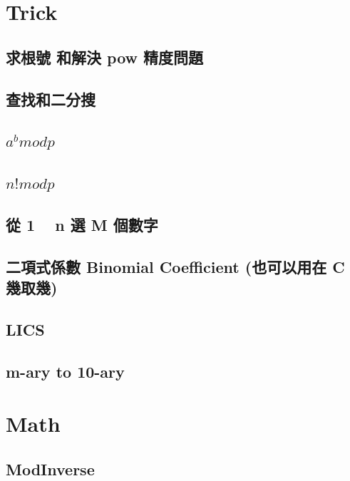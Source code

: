 \section{Trick}
    \subsection{求根號 和解決 pow 精度問題}
        
    \subsection{查找和二分搜}
        
    \subsection{$a^b mod p$}
         
    \subsection{$n! mod p$}
         
    \subsection{從 1 ~ n 選 M 個數字}
        
    \subsection{二項式係數 Binomial Coefficient (也可以用在 C 幾取幾)}
        
    \subsection{LICS}
        
    \subsection{m-ary to 10-ary}
        

\section{Math}
    \subsection{ModInverse}
        
